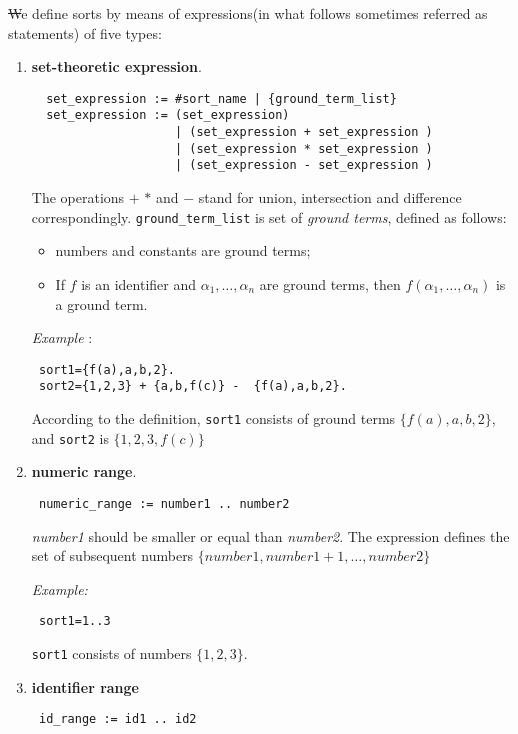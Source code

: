 \documentclass[12pt, letterpaper]{article}
\begin{document}
\st We define sorts by means of expressions(in what follows sometimes referred as statements) of five types:

\begin{enumerate}
 \item \textbf{set-theoretic expression}.
 \begin{verbatim}
  set_expression := #sort_name | {ground_term_list}
  set_expression := (set_expression) 
                    | (set_expression + set_expression ) 
                    | (set_expression * set_expression ) 
                    | (set_expression - set_expression )
  \end{verbatim}
The operations $+$ $*$ and $-$ stand for union, intersection and difference correspondingly.
\texttt{ground\_term\_list} is set of \textit{ground terms}, defined as follows:
\begin{itemize}
 \item numbers and constants are ground terms;
 \item If $f$ is an identifier and $\alpha_1, \dots, \alpha_n$ are ground terms, then $f(\alpha_1,\dots, \alpha_n)$ is a ground term.
\end{itemize}
\textit{Example} : 
\begin{verbatim}
 sort1={f(a),a,b,2}.
 sort2={1,2,3} + {a,b,f(c)} -  {f(a),a,b,2}.
\end{verbatim}
According to the definition, \texttt{sort1} consists of ground terms $\{f(a),a,b,2\}$, and \texttt{sort2} is $\{1,2,3,f(c)\}$ 

\item \textbf{numeric range}.
\begin{verbatim}
 numeric_range := number1 .. number2
\end{verbatim}

\textit{number1} should be smaller or equal than \textit{number2}. The expression defines the set 
of subsequent numbers $\{number1, number1+1, \dots, number2\}$

\textit{Example:}

\begin{verbatim}
 sort1=1..3
\end{verbatim}
\texttt{sort1} consists of numbers $\{1,2,3\}$.


\item \textbf{identifier range}


\begin{verbatim}
 id_range := id1 .. id2
\end{verbatim}


\end{enumerate}
\end{document}
